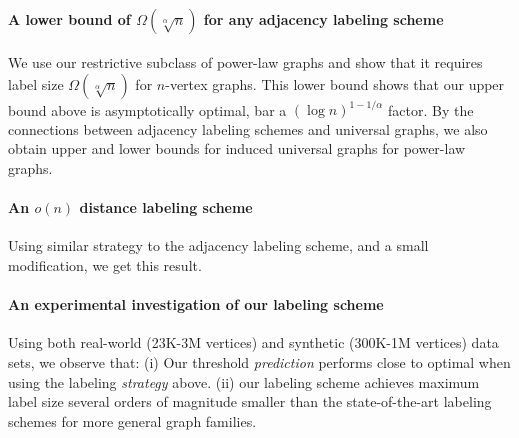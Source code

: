 \paragraph{A lower bound of $\Omega(\sqrt[\alpha]{n})$ for any adjacency labeling scheme}
We use our  restrictive subclass of power-law graphs and  show that it requires label size $\Omega(\sqrt[\alpha]{n})$ for $n$-vertex graphs.
This lower bound shows that our upper bound above is asymptotically  optimal, bar a $(\log n)^{1 - 1/\alpha}$ factor.
By the connections between adjacency labeling schemes and universal graphs, we also obtain upper and lower bounds for induced universal graphs for power-law graphs. 

\paragraph{An $o(n)$ distance labeling scheme}
Using similar strategy to the adjacency labeling scheme, and a small modification, we get this result.


\paragraph{An experimental investigation  of our labeling scheme}
Using both real-world (23K-3M vertices) and synthetic (300K-1M vertices) data sets, we observe that:
(i) Our threshold \emph{prediction} performs close to optimal when using the labeling \emph{strategy} above. 
(ii) our labeling scheme achieves maximum label size several orders of magnitude smaller than the state-of-the-art labeling schemes for more general graph families.


